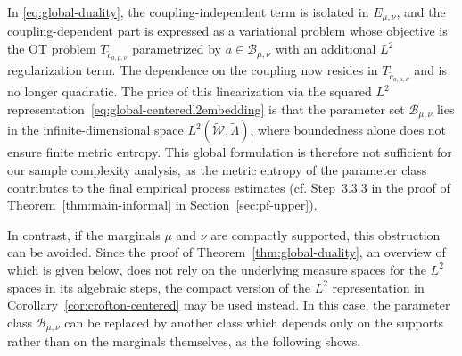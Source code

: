 \documentclass[11pt]{amsart}
\theoremstyle{definition}
\theoremstyle{remark}
\newcommand{\1}{\mathbf{1}}
\numberwithin{equation}{section}
\begin{document}
In \eqref{eq:global-duality},
the coupling-independent term is isolated in $E_{\mu,\nu}$, and the
coupling-dependent part is expressed as a variational problem whose
objective is the OT problem $T_{\widetilde c_{a,\mu,\nu}}$ parametrized by $a\in \mathcal B_{\mu,\nu}$ with an additional
$L^2$ regularization term. The dependence on the coupling now resides
in $T_{\widetilde c_{a,\mu,\nu}}$ and is no longer quadratic. The price of this
linearization via the squared $L^2$ representation~\eqref{eq:global-centeredl2embedding}
is that the parameter set $\mathcal{B}_{\mu,\nu}$ lies in the
infinite-dimensional space $L^2(\widetilde{\mathcal{W}}, \widetilde\Lambda)$, where
boundedness alone does not ensure finite metric entropy. This global formulation is
therefore not sufficient for our sample complexity analysis,
as the metric entropy of the parameter class contributes to the final
empirical process estimates (cf. Step~3.3.3 in the proof of Theorem~\ref{thm:main-informal} in Section~\ref{sec:pf-upper}). 

In contrast, if the marginals $\mu$ and $\nu$ are compactly supported, this obstruction can be avoided. Since the proof of Theorem~\ref{thm:global-duality}, an overview of which is given below, does not rely on the underlying measure spaces for the $L^2$ spaces in its algebraic steps, the compact version of the $L^2$ representation in Corollary~\ref{cor:crofton-centered} may be used instead. In this case,  the parameter class $\mathcal{B}_{\mu,\nu}$ can be replaced by another class which depends only on the supports rather than on the marginals themselves, as the following shows.
\end{document}
